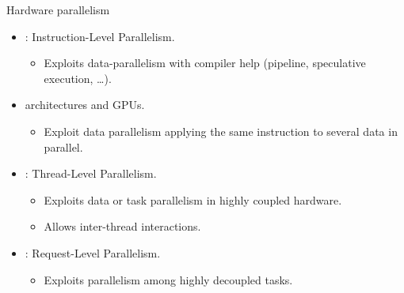 \begin{frame}[t]{Hardware parallelism}
\begin{itemize}
  \item {}: Instruction-Level Parallelism.
    \begin{itemize}
      \item Exploits data-parallelism with compiler help
      (pipeline, speculative execution, \ldots).
    \end{itemize}

  \item {} architectures and GPUs.
    \begin{itemize}
      \item Exploit data parallelism applying the same instruction to
            several data in parallel.
    \end{itemize}

  \item {}: Thread-Level Parallelism.
    \begin{itemize}
      \item Exploits data or task parallelism in highly coupled hardware.
      \item Allows inter-thread interactions.
    \end{itemize}

  \item {}: Request-Level Parallelism.
    \begin{itemize}
      \item Exploits parallelism among highly decoupled tasks.
    \end{itemize}
\end{itemize}
\end{frame}

